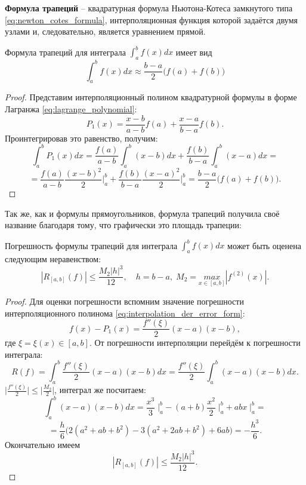 \documentclass[../main.tex]{subfile}
\begin{document}
\begin{define}
	\textbf{Формула трапеций} -- квадратурная формула Ньютона-Котеса
	замкнутого типа \eqref{eq:newton_cotes_formula}, интерполяционная
	функция которой задаётся двумя узлами и, следовательно, является
	уравнением прямой.
\end{define}

\begin{theorem}\label{eq:trapezoidal_rule}
	Формула трапеций для интеграла $\int_a^b f(x)dx$ имеет
	вид
	\[\boxed{\int_a^b f(x)dx\approx\frac{b-a}{2}\big(f(a)+f(b)\big)}\]
\end{theorem}

\begin{proof}
	Представим интерполяционный полином квадратурной формулы в форме
	Лагранжа \eqref{eq:lagrange_polynomial}:
	\[P_1(x)=\frac{x-b}{a-b}f(a)+\frac{x-a}{b-a}f(b).\]
	Проинтегрировав это равенство, получим:
	\[\int_a^b P_1(x)dx=\frac{f(a)}{a-b}\int_a^b (x-b)dx +
	\frac{f(b)}{b-a}\int_a^b (x-a)dx=\]
	\[=\frac{f(a)}{a-b}\frac{(x-b)^2}{2}\Big|_a^b+\frac{f(b)}{b-a}
	\frac{(x-a)^2}{2}\Big|_a^b=\frac{b-a}{2}\big(f(a)+f(b)\big).\]
\end{proof}

Так же, как и формулы прямоугольников, формула трапеций получила своё название
благодаря тому, что графически это площадь трапеции:


\begin{theorem}
\label{eq:trapezoidal_rule_error}
	Погрешность формулы трапеций для интеграла $\int_a^b f(x)dx$ может быть
	оценена следующим неравенством:
	\[\boxed{|R_{[a,b]}(f)|\le\frac{M_2|h|^3}{12}},\quad
	h=b-a,\;M_2=\underset{x\in[a,b]}{max}|f^{(2)}(x)|.\]
\end{theorem}

\begin{proof}
	Для оценки погрешности вспомним значение погрешности интерполяционного
	полинома \eqref{eq:interpolation_der_error_form}:
	\[f(x)-P_1(x)=\frac{f''(\xi)}{2}(x-a)(x-b),\]
	где $\xi=\xi(x)\in[a,b]$. От погрешности интерполяции перейдём к
	погрешности интеграла:
	\[R(f)=\int_a^b\frac{f''(\xi)}{2}(x-a)(x-b)dx=\frac{f''(\xi)}{2}\int_a^b
	(x-a)(x-b)dx.\]
	$\big|\frac{f''(\xi)}{2}\big|\le\big|\frac{M_2}{2}\big|$, интеграл же
	посчитаем:
	\[\int_a^b(x-a)(x-b)dx=\frac{x^3}{3}\;\Big|_a^b-(a+b)\frac{x^2}{2}\;
	\Big|_a^b+abx\;\Big|_a^b=\]
	\[=\frac{h}{6}\Big(2(a^2+ab+b^2)-3(a^2+2ab+b^2)+6ab\Big)=-\frac{h^3}{6}.
	\]
	Окончательно имеем
	\[|R_{[a,b]}(f)|\le\frac{M_2|h|^3}{12}.\]
\end{proof}
\end{document}

